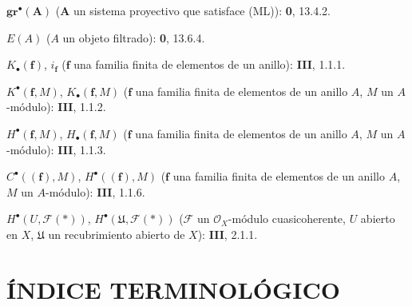 \documentclass[10pt,oneside,openany]{book}
\theoremstyle{egaenv}\newtheorem*{env}{---}
\theoremstyle{egastatement}
\theoremstyle{egadescription}
\newcommand{\oldpage}[2][]{\marginnote{\normalfont\scriptsize\textbf{#1}\,|\,#2}\ignorespaces}
\begin{document}
\begin{flushleft}
$\mathbf{gr}^\bullet(\mathbf A)$ ($\mathbf A$ un sistema proyectivo que satisface (ML)):
\textbf 0, 13.4.2.

$E(A)$ ($A$ un objeto filtrado): \textbf 0, 13.6.4.

$K_\bullet(\mathbf f)$, $i_{\mathbf f}$ ($\mathbf f$ una familia finita de
elementos de un anillo): \textbf{III}, 1.1.1.

$K^\bullet(\mathbf f,M)$, $K_\bullet(\mathbf f,M)$ ($\mathbf f$ una familia
finita de elementos de un anillo $A$, $M$ un $A$-módulo): \textbf{III}, 1.1.2.

$H^\bullet(\mathbf f,M)$, $H_\bullet(\mathbf f,M)$ ($\mathbf f$ una familia
finita de elementos de un anillo $A$, $M$ un $A$-módulo): \textbf{III}, 1.1.3.

$C^\bullet((\mathbf f),M)$, $H^\bullet((\mathbf f),M)$ ($\mathbf f$ una
familia finita de elementos de un anillo $A$, $M$ un $A$-módulo): \textbf{III}, 1.1.6.

$H^\bullet(U,\mathcal F(*))$,
$H^\bullet(\mathfrak U,\mathcal F(*))$ ($\mathcal F$ un
$\mathcal O_X$-módulo cuasicoherente, $U$ abierto en $X$, $\mathfrak U$ un recubrimiento abierto de $X$):
\textbf{III}, 2.1.1.
\end{flushleft}

\clearpage
\oldpage[III]{163}
\section*{ÍNDICE TERMINOLÓGICO}
\end{document}
